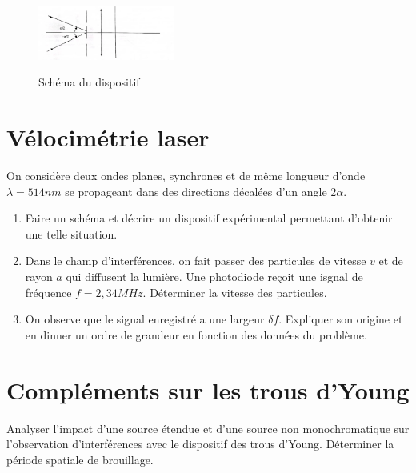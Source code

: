 \documentclass{article}
\begin{document}
\begin{figure}[h!]
  \centering
  \includegraphics[width=0.4\textwidth]{interféromètre stellaire .jpg}
  \label{fig:maison}
    \caption{Schéma du dispositif}
\end{figure}

\section{Vélocimétrie laser}

On considère deux ondes planes, synchrones et de même longueur d'onde $\lambda = 514 nm$ se propageant dans des directions décalées d'un angle $2 \alpha$. 
\begin{enumerate}
  \item Faire un schéma et décrire un dispositif expérimental permettant d'obtenir une telle situation. 
  \item Dans le champ d'interférences, on fait passer des particules de vitesse $v$ et de rayon $a$ qui diffusent la lumière. Une photodiode reçoit une isgnal de fréquence $f=2,34MHz$. Déterminer la vitesse des particules. 
  \item On observe que le signal enregistré a une largeur $\delta f$. Expliquer son origine et en dinner un ordre de grandeur en fonction des données du problème. 
\end{enumerate} 

\section{Compléments sur les trous d'Young}

Analyser l'impact d'une source étendue et d'une source non monochromatique sur l'observation d'interférences avec le dispositif des trous d'Young. 
Déterminer la période spatiale de brouillage. 
\end{document}
